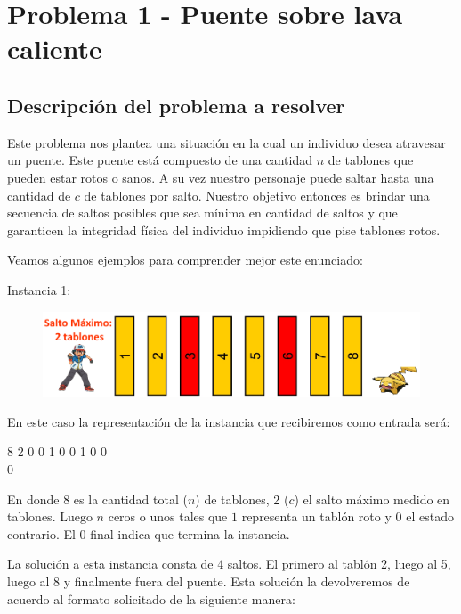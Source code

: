 \section{Problema 1 - Puente sobre lava caliente}



\subsection{Descripci\'on del problema a resolver}

Este problema nos plantea una situación en la cual un individuo desea atravesar un puente. Este puente está compuesto de una cantidad $n$ de tablones que pueden estar rotos o sanos. A su vez nuestro personaje puede saltar hasta una cantidad de $c$ de tablones por salto. Nuestro objetivo entonces es brindar una secuencia de saltos posibles que sea mínima en cantidad de saltos y que garanticen la integridad física del individuo impidiendo que pise tablones rotos.


Veamos algunos ejemplos para comprender mejor este enunciado:  

Instancia 1:

\begin{figure}[H]
\centering
\includegraphics[scale=0.5]{ej1/tabl_1.png}
\end{figure}

En este caso la representación de la instancia que recibiremos como entrada será:

\begin{addmargin}[4em]{0em}
\textsf{8 2 0 0 1 0 0 1 0 0} \\
\textsf{0}
\end{addmargin}

En donde 8 es la cantidad total ($n$) de tablones, 2 ($c$) el salto máximo medido en tablones. Luego $n$ ceros o unos tales que $1$ representa un tablón roto y $0$ el estado contrario. El 0 final indica que termina la instancia.

La solución a esta instancia consta de 4 saltos. El primero al tablón 2, luego al 5, luego al 8 y finalmente fuera del puente. Esta solución la devolveremos de acuerdo al formato solicitado de la siguiente manera:

